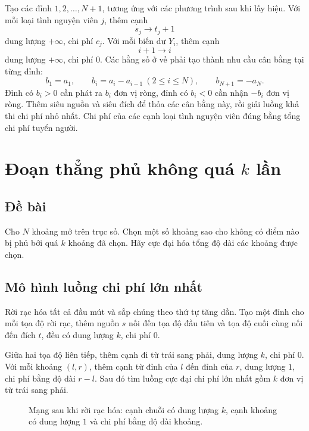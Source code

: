 \documentclass[11pt]{article}
\begin{document}
Tạo các đỉnh \(1,2,\ldots,N+1\), tương ứng với các phương trình sau khi lấy
hiệu. Với mỗi loại tình nguyện viên \(j\), thêm cạnh
\[
  s_j\to t_j+1
\]
dung lượng \(+\infty\), chi phí \(c_j\). Với mỗi biến dư \(Y_i\), thêm cạnh
\[
  i+1\to i
\]
dung lượng \(+\infty\), chi phí \(0\). Các hằng số ở vế phải tạo thành nhu cầu
cân bằng tại từng đỉnh:
\[
  b_1=a_1,\qquad b_i=a_i-a_{i-1}\ (2\le i\le N),\qquad b_{N+1}=-a_N.
\]
Đỉnh có \(b_i>0\) cần phát ra \(b_i\) đơn vị ròng, đỉnh có \(b_i<0\) cần nhận
\(-b_i\) đơn vị ròng. Thêm siêu nguồn và siêu đích để thỏa các cân bằng này,
rồi giải luồng khả thi chi phí nhỏ nhất. Chi phí của các cạnh loại tình
nguyện viên đúng bằng tổng chi phí tuyển người.

\section{Đoạn thẳng phủ không quá \texorpdfstring{\(k\)}{k} lần}

\subsection*{Đề bài}

Cho \(N\) khoảng mở trên trục số. Chọn một số khoảng sao cho không có điểm nào
bị phủ bởi quá \(k\) khoảng đã chọn. Hãy cực đại hóa tổng độ dài các khoảng
được chọn.

\subsection*{Mô hình luồng chi phí lớn nhất}

Rời rạc hóa tất cả đầu mút và sắp chúng theo thứ tự tăng dần. Tạo một đỉnh
cho mỗi tọa độ rời rạc, thêm nguồn \(s\) nối đến tọa độ đầu tiên và tọa độ
cuối cùng nối đến đích \(t\), đều có dung lượng \(k\), chi phí \(0\).

Giữa hai tọa độ liên tiếp, thêm cạnh đi từ trái sang phải, dung lượng \(k\),
chi phí \(0\). Với mỗi khoảng \((l,r)\), thêm cạnh từ đỉnh của \(l\) đến đỉnh
của \(r\), dung lượng \(1\), chi phí bằng độ dài \(r-l\). Sau đó tìm luồng cực
đại chi phí lớn nhất gồm \(k\) đơn vị từ trái sang phải.

\begin{figure}[ht]
\centering
{}
\caption{Mạng sau khi rời rạc hóa: cạnh chuỗi có dung lượng \(k\), cạnh khoảng có dung lượng \(1\) và chi phí bằng độ dài khoảng.}
\end{figure}
\end{document}

